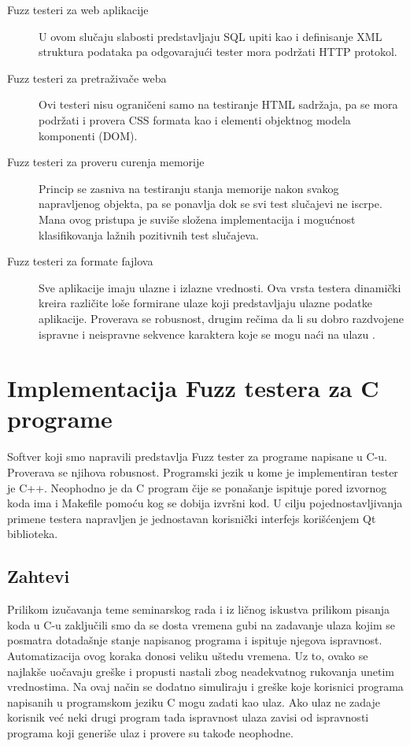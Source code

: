 \documentclass[a4paper]{article}
\begin{document}
{\begin{description}
\item[Fuzz testeri za web aplikacije] 
U ovom slučaju slabosti predstavljaju SQL upiti kao i definisanje XML struktura podataka pa odgovarajući tester mora podržati HTTP protokol.\\

\item[Fuzz testeri za pretraživače weba]
Ovi testeri nisu ograničeni samo na testiranje HTML sadržaja, pa se mora podržati i provera CSS formata kao i elementi objektnog modela komponenti (DOM).\\

\item[Fuzz testeri za proveru curenja memorije]
Princip se zasniva na testiranju stanja memorije nakon svakog napravljenog objekta, pa se ponavlja dok se svi test slučajevi ne iscrpe. Mana ovog pristupa je suviše složena implementacija i mogućnost klasifikovanja lažnih pozitivnih test slučajeva.\\

\item[Fuzz testeri za formate fajlova]
Sve aplikacije imaju ulazne i izlazne vrednosti. Ova vrsta testera dinamički kreira različite loše formirane ulaze koji predstavljaju ulazne podatke aplikacije. Proverava se robusnost, drugim rečima da li su dobro razdvojene ispravne i neispravne sekvence karaktera koje se mogu naći na ulazu \cite{fuzzingBruteForce}.\\
\end{description}

\section{Implementacija Fuzz testera za C programe}
\label{sec:implementacija_fuzz_testera}

Softver koji smo napravili predstavlja Fuzz tester za programe napisane u C-u. Proverava se njihova robusnost. Programski jezik u kome je implementiran tester je C++. Neophodno je da C program čije se ponašanje ispituje pored izvornog koda ima i Makefile pomoću kog se dobija izvršni kod. U cilju pojednostavljivanja primene testera napravljen je jednostavan korisnički interfejs korišćenjem Qt biblioteka. 

\subsection{Zahtevi}
\label{subsec:zahtevi_testera}

Prilikom izučavanja teme seminarskog rada i iz ličnog iskustva prilikom pisanja koda u C-u zaključili smo da se dosta vremena gubi na zadavanje ulaza kojim se posmatra dotadašnje stanje napisanog programa i ispituje njegova ispravnost. Automatizacija ovog koraka donosi veliku uštedu vremena. Uz to, ovako se najlakše uočavaju greške i propusti nastali zbog neadekvatnog rukovanja unetim vrednostima. Na ovaj način se dodatno simuliraju i greške koje korisnici programa napisanih u programskom jeziku C mogu zadati kao ulaz. Ako ulaz ne zadaje korisnik već neki drugi program tada ispravnost ulaza zavisi od ispravnosti programa koji generiše ulaz i provere su takođe neophodne.\\

}
\end{document}
